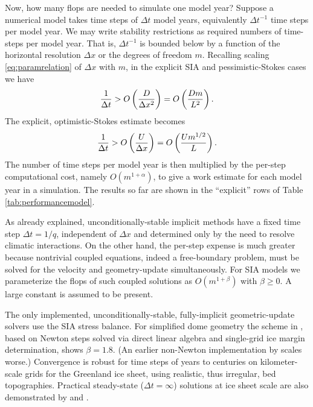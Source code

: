 \documentclass[twocolumn,letterpaper]{igs}
\begin{document}
Now, how many flops are needed to simulate one model year?  Suppose a numerical model takes time steps of $\Delta t$ model years, equivalently $\Delta t^{-1}$ time steps per model year.  We may write stability restrictions as required numbers of time-steps per model year.  That is, $\Delta t^{-1}$ is bounded below by a function of the horizontal resolution $\Delta x$ or the degrees of freedom $m$.  Recalling scaling \eqref{eq:paramrelation} of $\Delta x$ with $m$, in the explicit SIA and pessimistic-Stokes cases we have
\begin{equation}
\frac{1}{\Delta t} > \displaystyle O\left(\frac{D}{\Delta x^2}\right) = \displaystyle O\left(\frac{D m}{L^2}\right). \label{eq:explicitsiarequired}
\end{equation}
The explicit, optimistic-Stokes estimate becomes
\begin{equation}
\frac{1}{\Delta t} > \displaystyle O\left(\frac{U}{\Delta x}\right) = \displaystyle O\left(\frac{U m^{1/2}}{L}\right). \label{eq:explicitoptstokesrequired}
\end{equation}
The number of time steps per model year is then multiplied by the per-step computational cost, namely $O(m^{1+\alpha})$, to give a work estimate for each model year in a simulation.  The results so far are shown in the ``explicit'' rows of Table \ref{tab:performancemodel}.

As already explained, unconditionally-stable implicit methods have a fixed time step $\Delta t = 1/q$, independent of $\Delta x$ and determined only by the need to resolve climatic interactions.  On the other hand, the per-step expense is much greater because nontrivial coupled equations, indeed a free-boundary problem, must be solved for the velocity and geometry-update simultaneously.  For SIA models we parameterize the flops of such coupled solutions as $O(m^{1+\beta})$ with $\beta \ge 0$.  A large constant is assumed to be present.


The only implemented, unconditionally-stable, fully-implicit geometric-update solvers use the SIA stress balance.  For simplified dome geometry the scheme in \cite{Bueler2016}, based on Newton steps solved via direct linear algebra and single-grid ice margin determination, shows $\beta=1.8$.  (An earlier non-Newton implementation by \cite{JouvetBueler2012} scales worse.)  Convergence is robust for time steps of years to centuries on kilometer-scale grids for the Greenland ice sheet, using realistic, thus irregular, bed topographies.  Practical steady-state ($\Delta t=\infty$) solutions at ice sheet scale are also demonstrated by \cite{JouvetBueler2012} and \cite{Bueler2016}.
\end{document}
